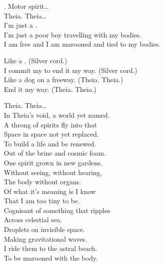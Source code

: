 
. Motor spirit… \\

Theia. Theia… \\

I'm just a . \\
I'm just a poor boy travelling with my bodies. \\
I am free and I am marooned and tied to my bodies. \\


Like a . (Silver cord.) \\
I commit my  to end it my way. (Silver cord.) \\

Like a dog on a freeway. (Theia. Theia.) \\
End it my way. (Theia. Theia.) \\


Theia. Theia… \\

In Theia's void, a world yet named. \\
A throng of spirits fly into that \\
Space in space not yet replaced. \\
To build a life and be renewed. \\
Out of the brine and cosmic foam. \\
One spirit grown in new gardens. \\
Without seeing, without hearing, \\
The body without organs. \\

Of what it's meaning is I know \\
That I am too tiny to be. \\
Cognisant of something that ripples \\
Across celestial sea. \\
Droplets on invisible space. \\
Making gravitational waves. \\
I ride them to the astral beach. \\
To be marooned with the body. \\


